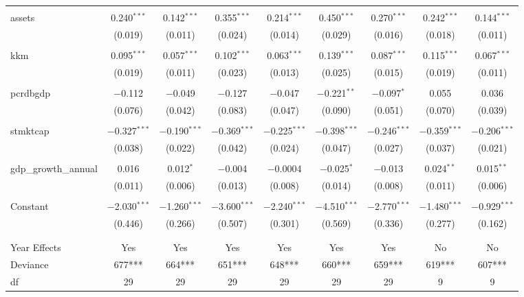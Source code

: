 \documentclass[a4paper, nobind]{templates/ociamthesis}
\begin{document}
\begin{landscape}
\begin{table}[!htbp]
\begin{tabular}{@{\extracolsep{5pt}}lcccccccc}
  & & & & & & & & \\ 
 assets & 0.240$^{***}$ & 0.142$^{***}$ & 0.355$^{***}$ & 0.214$^{***}$ & 0.450$^{***}$ & 0.270$^{***}$ & 0.242$^{***}$ & 0.144$^{***}$ \\ 
  & (0.019) & (0.011) & (0.024) & (0.014) & (0.029) & (0.016) & (0.018) & (0.011) \\ 
  & & & & & & & & \\ 
 kkm & 0.095$^{***}$ & 0.057$^{***}$ & 0.102$^{***}$ & 0.063$^{***}$ & 0.139$^{***}$ & 0.087$^{***}$ & 0.115$^{***}$ & 0.067$^{***}$ \\ 
  & (0.019) & (0.011) & (0.023) & (0.013) & (0.025) & (0.015) & (0.019) & (0.011) \\ 
  & & & & & & & & \\ 
 pcrdbgdp & $-$0.112 & $-$0.049 & $-$0.127 & $-$0.047 & $-$0.221$^{**}$ & $-$0.097$^{*}$ & 0.055 & 0.036 \\ 
  & (0.076) & (0.042) & (0.083) & (0.047) & (0.090) & (0.051) & (0.070) & (0.039) \\ 
  & & & & & & & & \\ 
 stmktcap & $-$0.327$^{***}$ & $-$0.190$^{***}$ & $-$0.369$^{***}$ & $-$0.225$^{***}$ & $-$0.398$^{***}$ & $-$0.246$^{***}$ & $-$0.359$^{***}$ & $-$0.206$^{***}$ \\ 
  & (0.038) & (0.022) & (0.042) & (0.024) & (0.047) & (0.027) & (0.037) & (0.021) \\ 
  & & & & & & & & \\ 
 gdp\_growth\_annual & 0.016 & 0.012$^{*}$ & $-$0.004 & $-$0.0004 & $-$0.025$^{*}$ & $-$0.013 & 0.024$^{**}$ & 0.015$^{**}$ \\ 
  & (0.011) & (0.006) & (0.013) & (0.008) & (0.014) & (0.008) & (0.011) & (0.006) \\ 
  & & & & & & & & \\ 
 Constant & $-$2.030$^{***}$ & $-$1.260$^{***}$ & $-$3.600$^{***}$ & $-$2.240$^{***}$ & $-$4.510$^{***}$ & $-$2.770$^{***}$ & $-$1.480$^{***}$ & $-$0.929$^{***}$ \\ 
  & (0.446) & (0.266) & (0.507) & (0.301) & (0.569) & (0.336) & (0.277) & (0.162) \\ 
  & & & & & & & & \\ 
\hline \\[-1.8ex] 
Year Effects & Yes & Yes & Yes & Yes & Yes & Yes & No & No \\ 
Deviance & 677*** & 664*** & 651*** & 648*** & 660*** & 659*** & 619*** & 607*** \\ 
df & 29 & 29 & 29 & 29 & 29 & 29 & 9 & 9 \\ 

\end{tabular}
\end{table}
\end{landscape}
\end{document}
